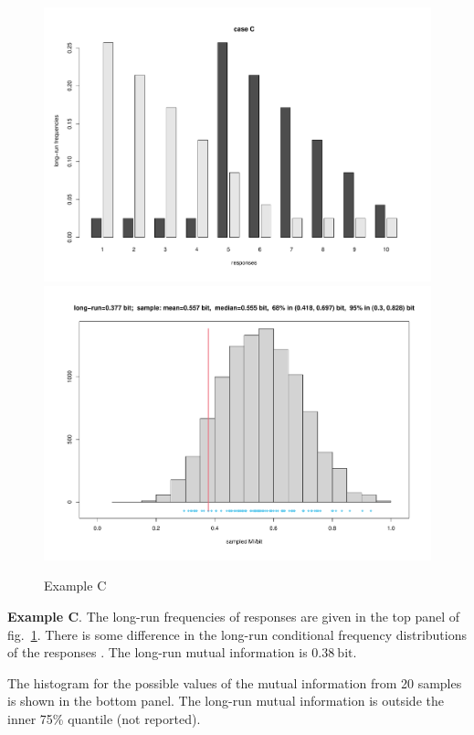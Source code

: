\documentclass[\ifafour a4paper,12pt,\else a5paper,10pt,\fi%
onecolumn,oneside,article,%
british%
]{memoir}
\theoremstyle{remark}
\theoremstyle{innote}
\renewcommand*{\|}[1][]{\nonscript\,#1\vert\nonscript\;\mathopen{}}
\renewcommand*{\=}{\TextOrMath\texteq\eq}
\newcommand*{\fig}{fig.}%
\newcommand*{\bit}{\mathrm{bit}}
\begin{document}
\clearpage

\begin{figure}[p]%
\centering\includegraphics[width=\linewidth]{scripts/resp_caseC.pdf}\\%
\includegraphics[width=\linewidth]{scripts/histo_caseC.pdf}\\
\caption{Example C}\label{fig:resp_caseC}
\end{figure}%
\textbf{Example C}. The long-run frequencies of responses are given in the top
panel of \fig~\ref{fig:resp_caseC}. There is some difference in the
long-run conditional frequency distributions of the responses . The
long-run mutual information is $0.38\:\bit$.

The histogram for the possible values of the mutual information from 20
samples is shown in the bottom panel. The long-run mutual information is
outside the inner 75\% quantile (not reported).
\end{document}
